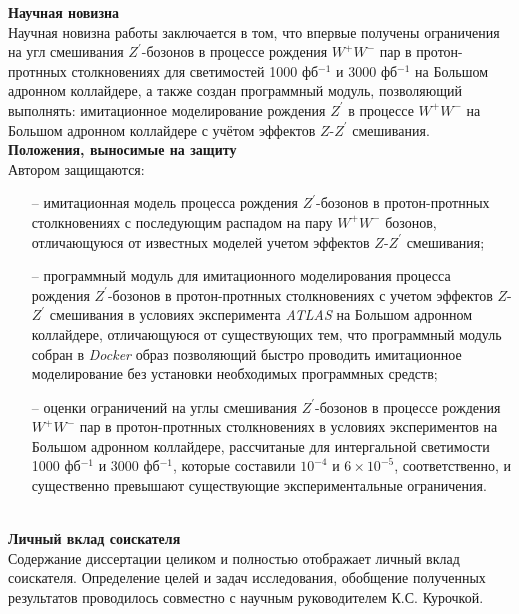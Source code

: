 \textbf{Научная новизна}\\

Научная новизна работы заключается в том, что впервые получены ограничения на угл смешивания ${Z}^{\prime}$-бозонов в
процессе рождения ${W}^{+}$${W}^{-}$ пар в протон-протнных столкновениях для светимостей 1000 фб${}^{−1}$ и 3000 фб${}^{−1}$ на Большом адронном коллайдере, а также создан программный модуль, позволяющий выполнять: имитационное моделирование рождения ${Z}^{\prime}$ в процессе ${W}^{+}{W}^{-}$
на Большом адронном коллайдере с учётом эффектов $Z$-${Z}^{\prime}$ смешивания.
\\

\textbf{Положения, выносимые на защиту}\\

Автором защищаются:
\begin{enumerate}
	\item[--] имитационная модель процесса рождения ${Z}^{\prime}$-бозонов в протон-протнных столкновениях с последующим распадом на пару ${W}^{+}{W}^{-}$ бозонов, отличающуюся от известных моделей учетом эффектов $Z$-${Z}^{\prime}$ смешивания;
	
	\item[--] программный модуль для имитационного моделирования процесса
	рождения ${Z}^{\prime}$-бозонов в протон-протнных столкновениях с учетом эффектов $Z$-${Z}^{\prime}$ смешивания в условиях эксперимента \textit{ATLAS} на Большом адронном коллайдере, отличающуюся от существующих тем, что программный модуль собран в \textit{Docker} образ позволяющий быстро проводить имитационное моделирование без установки необходимых программных средств;
	
	\item[--] оценки ограничений на углы смешивания ${Z}^{\prime}$-бозонов в
	процессе рождения ${W}^{+}$${W}^{-}$ пар в протон-протнных столкновениях
	в условиях экспериментов на Большом адронном коллайдере, рассчитаные для интергальной светимости 1000 фб${}^{−1}$ и 3000 фб${}^{−1}$, которые составили  ${10}^{-4}$ и $6\times{10}^{-5}$, соответственно, и существенно превышают существующие экспериментальные ограничения.
	
\end{enumerate}
\\

\textbf{Личный вклад соискателя}\\

Содержание диссертации целиком и полностью отображает личный вклад соискателя. Определение целей и задач исследования, обобщение полученных результатов проводилось совместно с научным руководителем К.С. Курочкой.


